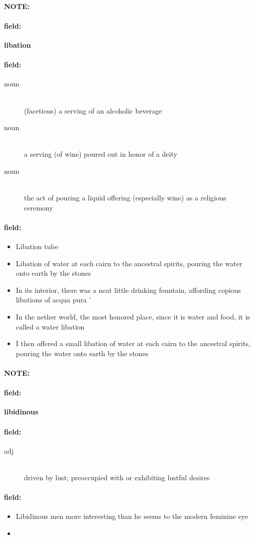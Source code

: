 \documentclass[12pt]{article}
\newenvironment{note}{\paragraph{NOTE:}}{}
\newenvironment{field}{\paragraph{field:}}{}
\begin{document}
\begin{note}
\begin{field}
\textbf{\large libation}
\end{field}


\begin{field}
\begin{description}
\item[noun] \hfill \\ 
(facetious) a serving of an alcoholic beverage

\item[noun] \hfill \\ 
a serving (of wine) poured out in honor of a deity

\item[noun] \hfill \\ 
the act of pouring a liquid offering (especially wine) as a religious ceremony

\end{description}
\end{field}

\begin{field}
\begin{itemize}
\item Libation tube
\item Libation of water at each cairn to the ancestral spirits, pouring the water onto earth by the stones
\item In its interior, there was a neat little drinking fountain, affording copious libations of acqua pura ' 
\item In the nether world, the most honored place, since it is water and food, it is called a water libation
\item I then offered a small libation of water at each cairn to the ancestral spirits, pouring the water onto earth by the stones
\end{itemize}
\end{field}
\end{note}
\begin{note}
\begin{field}
\textbf{\large libidinous}
\end{field}


\begin{field}
\begin{description}
\item[adj] \hfill \\ 
driven by lust; preoccupied with or exhibiting lustful desires

\end{description}
\end{field}

\begin{field}
\begin{itemize}
\item Libidinous men more interesting than he seems to the modern feminine eye
\item 
\end{itemize}
\end{field}
\end{note}
\end{document}
